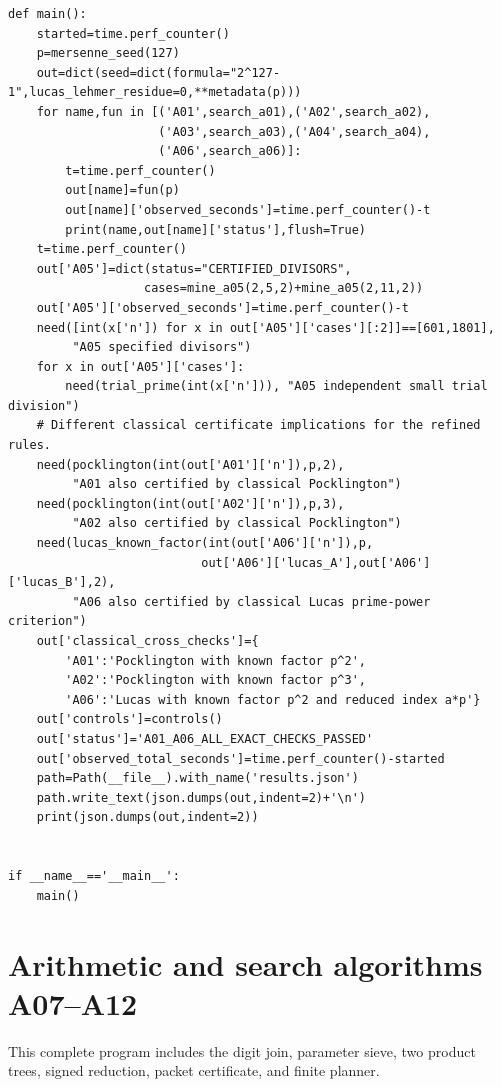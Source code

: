 \documentclass[11pt,a4paper]{article}
\theoremstyle{definition}\newtheorem{definition}[theorem]{Definition}
\theoremstyle{remark}\newtheorem{remark}[theorem]{Remark}
\begin{document}
\begin{lstlisting}[label=lst:constructions]
def main():
    started=time.perf_counter()
    p=mersenne_seed(127)
    out=dict(seed=dict(formula="2^127-1",lucas_lehmer_residue=0,**metadata(p)))
    for name,fun in [('A01',search_a01),('A02',search_a02),
                     ('A03',search_a03),('A04',search_a04),
                     ('A06',search_a06)]:
        t=time.perf_counter()
        out[name]=fun(p)
        out[name]['observed_seconds']=time.perf_counter()-t
        print(name,out[name]['status'],flush=True)
    t=time.perf_counter()
    out['A05']=dict(status="CERTIFIED_DIVISORS",
                   cases=mine_a05(2,5,2)+mine_a05(2,11,2))
    out['A05']['observed_seconds']=time.perf_counter()-t
    need([int(x['n']) for x in out['A05']['cases'][:2]]==[601,1801],
         "A05 specified divisors")
    for x in out['A05']['cases']:
        need(trial_prime(int(x['n'])), "A05 independent small trial division")
    # Different classical certificate implications for the refined rules.
    need(pocklington(int(out['A01']['n']),p,2),
         "A01 also certified by classical Pocklington")
    need(pocklington(int(out['A02']['n']),p,3),
         "A02 also certified by classical Pocklington")
    need(lucas_known_factor(int(out['A06']['n']),p,
                           out['A06']['lucas_A'],out['A06']['lucas_B'],2),
         "A06 also certified by classical Lucas prime-power criterion")
    out['classical_cross_checks']={
        'A01':'Pocklington with known factor p^2',
        'A02':'Pocklington with known factor p^3',
        'A06':'Lucas with known factor p^2 and reduced index a*p'}
    out['controls']=controls()
    out['status']='A01_A06_ALL_EXACT_CHECKS_PASSED'
    out['observed_total_seconds']=time.perf_counter()-started
    path=Path(__file__).with_name('results.json')
    path.write_text(json.dumps(out,indent=2)+'\n')
    print(json.dumps(out,indent=2))


if __name__=='__main__':
    main()
\end{lstlisting}

\clearpage
\section{Arithmetic and search algorithms A07--A12}
\label{app:arithmetic}

This complete program includes the digit join, parameter sieve, two product trees, signed reduction, packet certificate, and finite planner.
\end{document}
